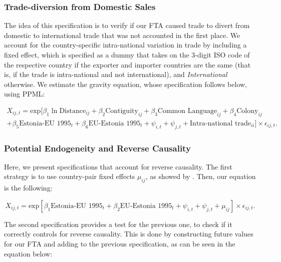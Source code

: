 \documentclass[a4paper,10pt]{article}
\begin{document}
\subsubsection{Trade-diversion from Domestic Sales} \label{fta_tradediversion}

The idea of this specification is to verify if our FTA caused trade to divert from domestic to international trade that was not accounted in the first place. We account for the country-specific intra-national variation in trade by
including a fixed effect, which is specified as a dummy that takes on the 3-digit ISO code of the respective country if the exporter and importer countries are the same (that is, if the trade is intra-national and not international), and \textit{International} otherwise. We estimate the gravity equation, whose specification follows below, using PPML:

\vspace{-0.7cm}

\begin{multline*}
	X_{ij,t} = \text{exp} [\beta_{1} \ln \text{Distance}_{ij} + \beta_{2} \text{Contiguity}_{ij} + \beta_{3} \text{Common Language}_{ij} + \beta_{4} \text{Colony}_{ij} \\
	+ \beta_{5} \text{Estonia-EU 1995}_{t} + \beta_{6} \text{EU-Estonia 1995}_{t} + \psi_{i,t} + \psi_{j,t} + \text{Intra-national trade}_{ii}] \times \epsilon_{ij,t}.
\end{multline*}

\subsubsection{Potential Endogeneity and Reverse Causality} \label{fta_endogeneity}

Here, we present specifications that account for reverse causality. The first strategy is to use country-pair fixed effects $\mu_{ij}$, as showed by \cite{baier_free_2007}. Then, our equation is the following:

\vspace{-0.5cm}

\begin{equation*}
	X_{ij,t} = \text{exp} [\beta_{1} \text{Estonia-EU 1995}_{t} + \beta_{2} \text{EU-Estonia 1995}_{t} + \psi_{i,t} + \psi_{j,t} + \mu_{ij}] \times \epsilon_{ij,t}.
\end{equation*}

The second specification provides a test for the previous one, to check if it correctly controls for reverse causality. This is done by constructing future values for our FTA and adding to the previous specification, as can be seen in the equation below:
\end{document}
